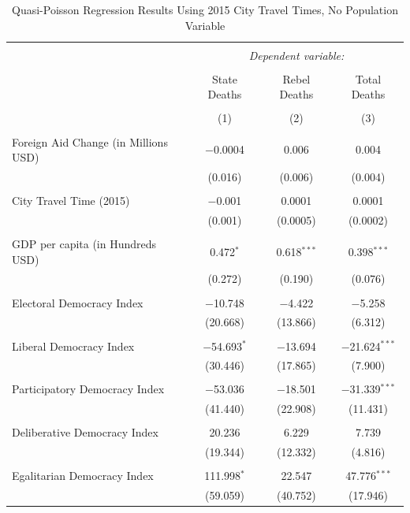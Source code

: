 \documentclass[12pt, letterpaper]{article}
\begin{document}
\begin{table}[!htbp] \centering 
	\caption{Quasi-Poisson Regression Results Using 2015 City Travel Times, No Population Variable} 
	\begin{tabular}{@{\extracolsep{5pt}}lccc} 
	\\[-1.8ex]\hline 
	\hline \\[-1.8ex] 
	& \multicolumn{3}{c}{\textit{Dependent variable:}} \\ 
	\cline{2-4} 
	\\[-1.8ex] & State Deaths & Rebel Deaths & Total Deaths \\ 
	\\[-1.8ex] & (1) & (2) & (3)\\ 
	\hline \\[-1.8ex] 
	Foreign Aid Change (in Millions USD) & $-$0.0004 & 0.006 & 0.004 \\ 
	& (0.016) & (0.006) & (0.004) \\ 
	& & & \\ 
	City Travel Time (2015) & $-$0.001 & 0.0001 & 0.0001 \\ 
	& (0.001) & (0.0005) & (0.0002) \\ 
	& & & \\ 
	GDP per capita (in Hundreds USD) & 0.472$^{*}$ & 0.618$^{***}$ & 0.398$^{***}$ \\ 
	& (0.272) & (0.190) & (0.076) \\ 
	& & & \\ 
	Electoral Democracy Index & $-$10.748 & $-$4.422 & $-$5.258 \\ 
	& (20.668) & (13.866) & (6.312) \\ 
	& & & \\ 
	Liberal Democracy Index & $-$54.693$^{*}$ & $-$13.694 & $-$21.624$^{***}$ \\ 
	& (30.446) & (17.865) & (7.900) \\ 
	& & & \\ 
	Participatory Democracy Index & $-$53.036 & $-$18.501 & $-$31.339$^{***}$ \\ 
	& (41.440) & (22.908) & (11.431) \\ 
	& & & \\ 
	Deliberative Democracy Index & 20.236 & 6.229 & 7.739 \\ 
	& (19.344) & (12.332) & (4.816) \\ 
	& & & \\ 
	Egalitarian Democracy Index & 111.998$^{*}$ & 22.547 & 47.776$^{***}$ \\ 
	& (59.059) & (40.752) & (17.946) \\ 

\end{tabular}
\end{table}
\end{document}
